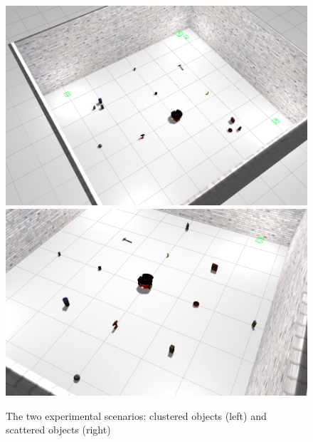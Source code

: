 
\begin{figure}
  \centering
	\includegraphics[width=0.4\linewidth]{src/clustered.png}
	\hspace{0.05\linewidth}
	\includegraphics[width=0.43\linewidth]{src/scattered.png}
	\caption{The two experimental scenarios: clustered objects (left) and scattered objects (right)}
\end{figure}